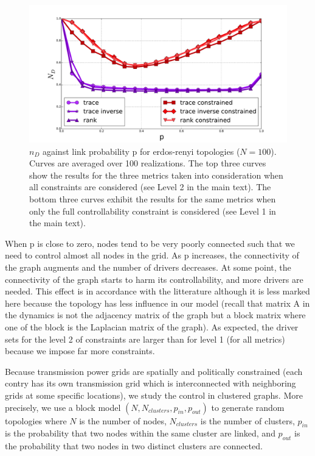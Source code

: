\documentclass[conference]{IEEEtran}
\begin{document}
\begin{figure}
\label{fig:erdos_renyi}
\includegraphics[scale=.25]{./figure_4/figure_4}
\caption{ $ n_D $ against link probability p for erdos-renyi topologies ($ N=100 $). Curves are averaged over 100 realizations. The top three curves show the results for the three metrics taken into consideration when all constraints are considered (see Level 2 in the main text). The bottom three curves exhibit the results for the same metrics when only the full controllability constraint is considered (see Level 1 in the main text).}
\end{figure}


When p is close to zero, nodes tend to be very poorly connected such that we need to control almost all nodes in the grid. As p increases, the connectivity of the graph augments and the number of drivers decreases. At some point, the connectivity of the graph starts to harm its controllability, and more drivers are needed. This effect is in accordance with the litterature although it is less marked here because the topology has less influence in our model (recall that matrix A in the dynamics is not the adjacency matrix of the graph but a block matrix where one of the block is the Laplacian matrix of the graph). As expected, the driver sets for the level 2 of constraints are larger than for level 1 (for all metrics) because we impose far more constraints.



Because transmission power grids are spatially and politically constrained (each contry has its own transmission grid which is interconnected with neighboring grids at some specific locations), we study the control in clustered graphs. More precisely, we use a block model $(N, N_{clusters}, p_{in}, p_{out} ) $ to generate random topologies where $ N $ is the number of nodes, $N_{clusters} $ is the number of clusters, $p_{in} $ is the probability that two nodes within the same cluster are linked, and $ p_{out} $ is the probability that two nodes in two distinct clusters are connected.
\end{document}
